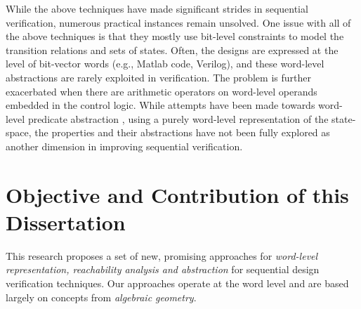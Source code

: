 While the above techniques have made significant strides in sequential
verification, numerous practical instances remain unsolved. One issue
with all of the above techniques is that they mostly use bit-level
constraints to model the transition relations and sets of 
states. Often,
the designs are expressed at the level of bit-vector words
(e.g., Matlab code, Verilog), and these word-level abstractions are
rarely exploited in verification. The problem is further exacerbated
when there are arithmetic operators on word-level operands embedded in
the control logic. While attempts have been made towards word-level
predicate abstraction \cite{jain2005word,mcmillan:cav06,mcmillan2010lazy}, 
using a purely word-level representation
  of the state-space, the properties and their abstractions have not
  been fully explored as another dimension in improving sequential
  verification.


   



\section{Objective and Contribution of this Dissertation}
This research proposes a
set of new, promising approaches for {\it word-level representation,
reachability analysis and abstraction} for sequential design verification techniques. 
Our approaches operate at the word level and are based
largely on concepts from {\it algebraic geometry}. 

